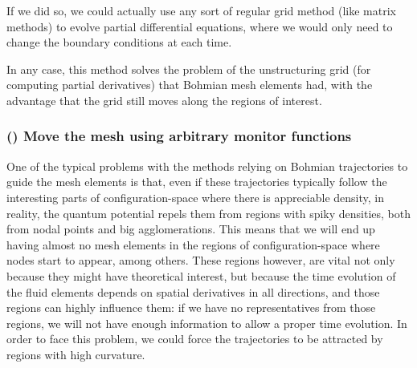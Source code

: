 \documentclass[11pt, a4paper]{article} %
\begin{document}
If we did so, we could actually use any sort of regular grid method (like matrix methods) to evolve partial differential equations, where we would only need to change the boundary conditions at each time.

In any case, this method solves the problem of the unstructuring grid (for computing partial derivatives) that Bohmian mesh elements had, with the advantage that the grid still moves along the regions of interest.

\subsubsection*{\bf (\textgamma) Move the mesh using arbitrary monitor functions } 
One of the typical problems with the methods relying on Bohmian trajectories to guide the mesh elements is that, even if these trajectories typically follow the interesting parts of configuration-space where there is appreciable density, in reality, the quantum potential repels them from regions with spiky densities, both from nodal points and big agglomerations. This means that we will end up having almost no mesh elements in the regions of configuration-space where nodes start to appear, among others. These regions however, are vital not only because they might have theoretical interest, but because the time evolution of the fluid elements depends on spatial derivatives in all directions, and those regions can highly influence them: if we have no representatives from those regions, we will not have enough information to allow a proper time evolution. In order to face this problem, we could force the trajectories to be attracted by regions with high curvature.
\end{document}
